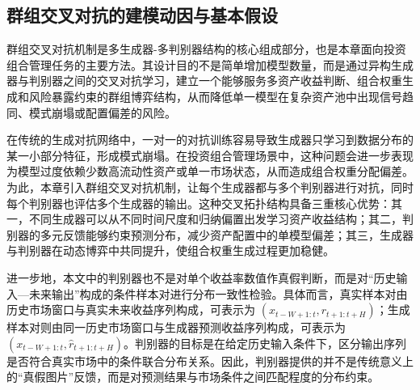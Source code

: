 \subsection{群组交叉对抗的建模动因与基本假设}

群组交叉对抗机制是多生成器-多判别器结构的核心组成部分，也是本章面向投资组合管理任务的主要方法。其设计目的不是简单增加模型数量，而是通过异构生成器与判别器之间的交叉对抗学习，建立一个能够服务多资产收益判断、组合权重生成和风险暴露约束的群组博弈结构，从而降低单一模型在复杂资产池中出现信号趋同、模式崩塌或配置偏差的风险。

在传统的生成对抗网络中，一对一的对抗训练容易导致生成器只学习到数据分布的某一小部分特征，形成模式崩塌。在投资组合管理场景中，这种问题会进一步表现为模型过度依赖少数高流动性资产或单一市场状态，从而造成组合权重分配偏差。为此，本章引入群组交叉对抗机制，让每个生成器都与多个判别器进行对抗，同时每个判别器也评估多个生成器的输出。这种交叉拓扑结构具备三重核心优势：其一，不同生成器可以从不同时间尺度和归纳偏置出发学习资产收益结构；其二，判别器的多元反馈能够约束预测分布，减少资产配置中的单模型偏差；其三，生成器与判别器在动态博弈中共同提升，使组合权重生成过程更加稳健。

进一步地，本文中的判别器也不是对单个收益率数值作真假判断，而是对“历史输入—未来输出”构成的条件样本对进行分布一致性检验。具体而言，真实样本对由历史市场窗口与真实未来收益序列构成，可表示为 $(x_{t-W+1:t}, r_{t+1:t+H})$；生成样本对则由同一历史市场窗口与生成器预测收益序列构成，可表示为 $(x_{t-W+1:t}, \hat{r}_{t+1:t+H})$。判别器的目标是在给定历史输入条件下，区分输出序列是否符合真实市场中的条件联合分布关系。因此，判别器提供的并不是传统意义上的“真假图片”反馈，而是对预测结果与市场条件之间匹配程度的分布约束。

